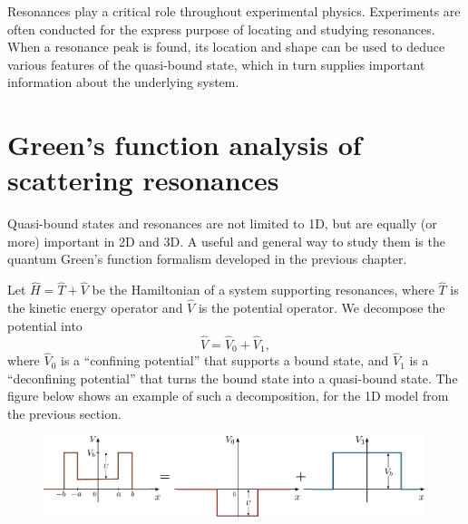 \documentclass[pra,12pt]{revtex4}
\begin{document}
Resonances play a critical role throughout experimental physics.
Experiments are often conducted for the express purpose of locating
and studying resonances.  When a resonance peak is found, its location
and shape can be used to deduce various features of the quasi-bound
state, which in turn supplies important information about the
underlying system.

\section{Green's function analysis of scattering resonances}
\label{sec:green_resonances}

Quasi-bound states and resonances are not limited to 1D, but are
equally (or more) important in 2D and 3D.  A useful and general way to
study them is the quantum Green's function formalism developed in the
previous chapter.

Let $\hat{H} = \hat{T} + \hat{V}$ be the Hamiltonian of a system
supporting resonances, where $\hat{T}$ is the kinetic energy operator
and $\hat{V}$ is the potential operator.  We decompose the potential
into
\begin{equation}
  \hat{V} = \hat{V}_0 + \hat{V}_1,
\end{equation}
where $\hat{V}_0$ is a ``confining potential'' that supports a bound
state, and $\hat{V}_1$ is a ``deconfining potential'' that turns the
bound state into a quasi-bound state.  The figure below shows an
example of such a decomposition, for the 1D model from the previous
section.

\begin{figure}[h]
  \centering\includegraphics[width=0.99\textwidth]{resonancewell_decomp}
\end{figure}
\end{document}
